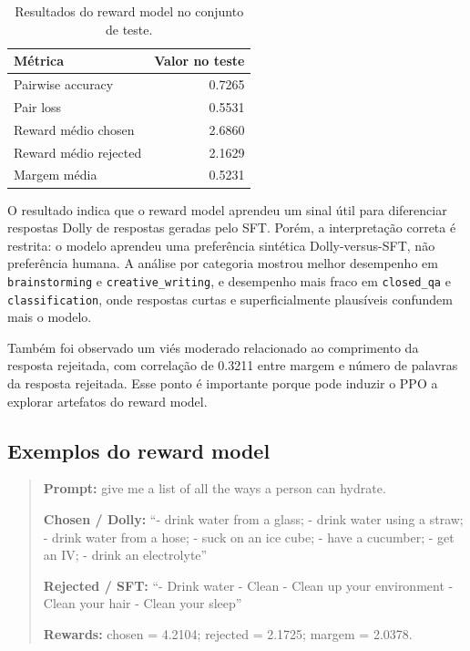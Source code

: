 \documentclass[a4paper,12pt]{article}
\begin{document}
\begin{table}[h]
\centering
\begin{tabular}{|l|r|}
\hline
\textbf{Métrica} & \textbf{Valor no teste} \\
\hline
Pairwise accuracy & 0.7265 \\
Pair loss & 0.5531 \\
Reward médio chosen & 2.6860 \\
Reward médio rejected & 2.1629 \\
Margem média & 0.5231 \\
\hline
\end{tabular}
\caption{Resultados do reward model no conjunto de teste.}
\end{table}

O resultado indica que o reward model aprendeu um sinal útil para diferenciar respostas Dolly de respostas geradas pelo SFT. Porém, a interpretação correta é restrita: o modelo aprendeu uma preferência sintética Dolly-versus-SFT, não preferência humana. A análise por categoria mostrou melhor desempenho em \texttt{brainstorming} e \texttt{creative\_writing}, e desempenho mais fraco em \texttt{closed\_qa} e \texttt{classification}, onde respostas curtas e superficialmente plausíveis confundem mais o modelo.

Também foi observado um viés moderado relacionado ao comprimento da resposta rejeitada, com correlação de 0.3211 entre margem e número de palavras da resposta rejeitada. Esse ponto é importante porque pode induzir o PPO a explorar artefatos do reward model.

\subsection*{Exemplos do reward model}

\begin{quote}
\small
\textbf{Prompt:} give me a list of all the ways a person can hydrate.

\textbf{Chosen / Dolly:} ``- drink water from a glass; - drink water using a straw; - drink water from a hose; - suck on an ice cube; - have a cucumber; - get an IV; - drink an electrolyte''

\textbf{Rejected / SFT:} ``- Drink water - Clean - Clean up your environment - Clean your hair - Clean your sleep''

\textbf{Rewards:} chosen = 4.2104; rejected = 2.1725; margem = 2.0378.
\end{quote}
\end{document}
